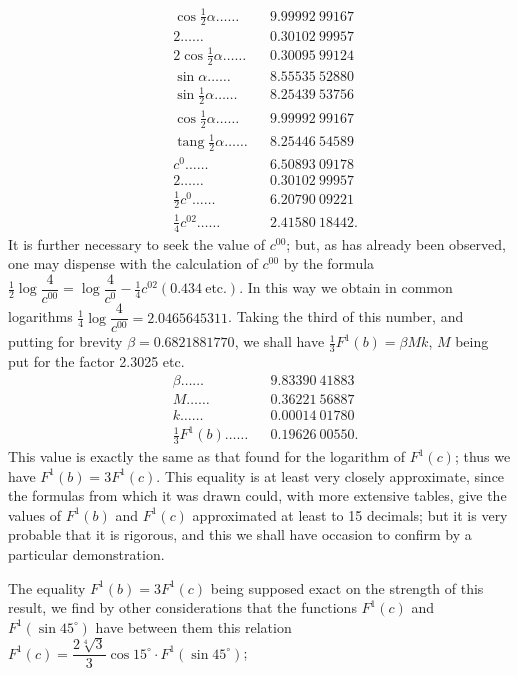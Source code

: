 \documentclass{article}
\begin{document}
\[ \begin{aligned} &\cos\tfrac{1}{2}\alpha\ldots\ldots && 9.99992\ 99167\\ &2\ldots\ldots && 0.30102\ 99957\\ &2\cos\tfrac{1}{2}\alpha\ldots\ldots && 0.30095\ 99124\\ &\sin\alpha\ldots\ldots && 8.55535\ 52880\\ &\sin\tfrac{1}{2}\alpha\ldots\ldots && 8.25439\ 53756\\ &\cos\tfrac{1}{2}\alpha\ldots\ldots && 9.99992\ 99167\\ &\operatorname{tang}\tfrac{1}{2}\alpha\ldots\ldots && 8.25446\ 54589\\ &c^{0}\ldots\ldots && 6.50893\ 09178\\ &2\ldots\ldots && 0.30102\ 99957\\ &\tfrac{1}{2}c^{0}\ldots\ldots && 6.20790\ 09221\\ &\tfrac{1}{4}c^{02}\ldots\ldots && 2.41580\ 18442. \end{aligned} \]
It is further necessary to seek the value of $c^{00}$; but, as has already been observed, one may dispense with the calculation of $c^{00}$ by the formula $\frac{1}{2}\log\dfrac{4}{c^{00}}=\log\dfrac{4}{c^{0}}-\frac{1}{4}c^{02}(0.434\ \text{etc.})$. In this way we obtain in common logarithms $\frac{1}{4}\log\dfrac{4}{c^{00}}=2.0465645311$. Taking the third of this number, and putting for brevity $\beta=0.6821881770$, we shall have $\frac{1}{3}F^{1}(b)=\beta Mk$, $M$ being put for the factor 2.3025 etc.
\[ \begin{aligned} &\beta\ldots\ldots && 9.83390\ 41883\\ &M\ldots\ldots && 0.36221\ 56887\\ &k\ldots\ldots && 0.00014\ 01780\\ &\tfrac{1}{3}F^{1}(b)\ldots\ldots && 0.19626\ 00550. \end{aligned} \]
This value is exactly the same as that found for the logarithm of $F^{1}(c)$; thus we have $F^{1}(b)=3F^{1}(c)$. This equality is at least very closely approximate, since the formulas from which it was drawn could, with more extensive tables, give the values of $F^{1}(b)$ and $F^{1}(c)$ approximated at least to 15 decimals; but it is very probable that it is rigorous, and this we shall have occasion to confirm by a particular demonstration.

The equality $F^{1}(b)=3F^{1}(c)$ being supposed exact on the strength of this result, we find by other considerations that the functions $F^{1}(c)$ and $F^{1}(\sin 45^{\circ})$ have between them this relation $F^{1}(c)=\dfrac{2\sqrt[4]{3}}{3}\cos 15^{\circ}\cdot F^{1}(\sin 45^{\circ})$;
\end{document}
